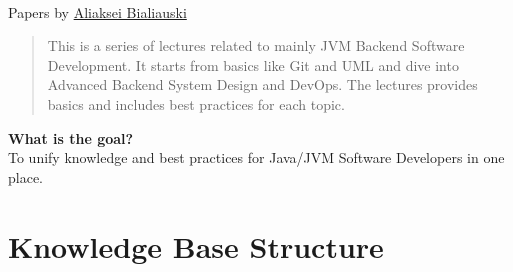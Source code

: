 \documentclass[nobrand,anonymous,nodate,nosecurity]{huawei}
\begin{document}
{\\
Papers by \href{h1alexbel.github.io/about-me.html}{Aliaksei Bialiauski}

\begin{abstract}
This is a series of lectures related to mainly JVM Backend Software Development.
It starts from basics like Git and UML and dive into Advanced Backend System Design and DevOps. The lectures provides basics and includes best practices for each topic.
\end{abstract}

\textbf{What is the goal?}\\
To unify knowledge and best practices for Java/JVM Software Developers in one place.
\section*{Knowledge Base Structure}

}
\end{document}
